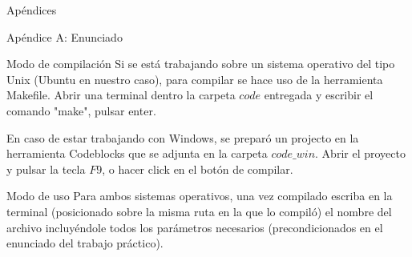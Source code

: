 \begin{section}{Apéndices}
	\begin{subsection}{Apéndice A: Enunciado}
		
	\end{subsection}
	\begin{subsection}{Modo de compilación}
		Si se está trabajando sobre un sistema operativo del tipo Unix (Ubuntu en nuestro caso), para compilar se hace uso de la herramienta Makefile.			
		Abrir una terminal dentro la carpeta $code$ entregada y escribir el comando "make", pulsar enter.
		
		En caso de estar trabajando con Windows, se preparó un projecto en la herramienta Codeblocks que se adjunta en la carpeta $code\_win$.
		Abrir el proyecto y pulsar la tecla $F9$, o hacer click en el botón de compilar.
	\end{subsection}	
	\begin{subsection}{Modo de uso}
		Para ambos sistemas operativos, una vez compilado escriba en la terminal (posicionado sobre la misma ruta en la que lo compiló) el nombre del archivo incluyéndole todos los parámetros necesarios (precondicionados en el enunciado del trabajo práctico).
	\end{subsection}
\end{section}
